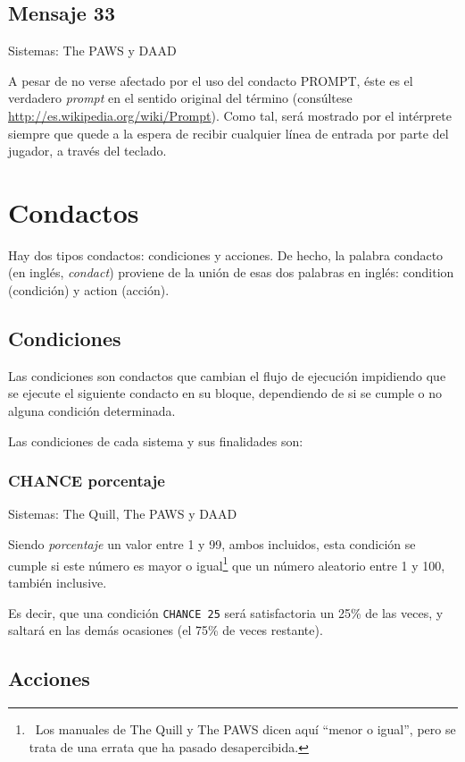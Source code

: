 \documentclass[11pt, a5paper]{article}
\newcommand{\quill}{\textsf{The Quill}\xspace}
\newcommand{\paw}{\textsf{The PAWS}\xspace}
\newcommand{\daad}{\textsf{DAAD}\xspace}
\newcommand{\sistemas}[1]{\noindent Sistemas: #1 \nopagebreak}
\begin{document}
\subsection{Mensaje 33}

\sistemas{\paw y \daad}

A pesar de no verse afectado por el uso del condacto PROMPT, éste es el verdadero \emph{prompt} en el sentido original del término (consúltese \url{http://es.wikipedia.org/wiki/Prompt}). Como tal, será mostrado por el intérprete siempre que quede a la espera de recibir cualquier línea de entrada por parte del jugador, a través del teclado.


\section{Condactos}

Hay dos tipos condactos: condiciones y acciones. De hecho, la palabra condacto (en inglés, \emph{condact}) proviene de la unión de esas dos palabras en inglés: condition (condición) y action (acción).

\subsection{Condiciones}

Las condiciones son condactos que cambian el flujo de ejecución impidiendo que se ejecute el siguiente condacto en su bloque, dependiendo de si se cumple o no alguna condición determinada.

Las condiciones de cada sistema y sus finalidades son:

\subsubsection{CHANCE porcentaje}

\sistemas{\quill, \paw y \daad}

Siendo \emph{porcentaje} un valor entre 1 y 99, ambos incluidos, esta condición se cumple si este número es mayor o igual\footnote{\ Los manuales de \quill y \paw dicen aquí ``menor o igual'', pero se trata de una errata que ha pasado desapercibida.} que un número aleatorio entre 1 y 100, también inclusive.

Es decir, que una condición \texttt{CHANCE 25} será satisfactoria un 25\% de las veces, y saltará en las demás ocasiones (el 75\% de veces restante).


\subsection{Acciones}
\end{document}
